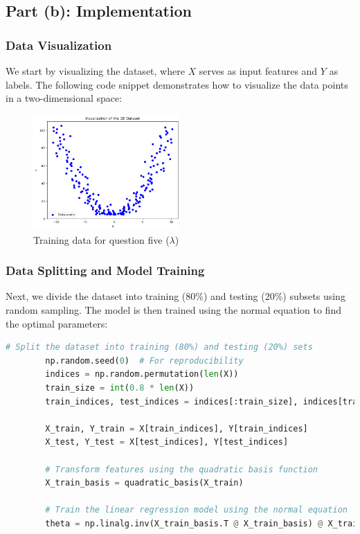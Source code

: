 \documentclass{article}
\begin{document}
	\subsection*{Part (b): Implementation}
	
	\subsubsection*{Data Visualization}
	We start by visualizing the dataset, where \( X \) serves as input features and \( Y \) as labels. The following code snippet demonstrates how to visualize the data points in a two-dimensional space:
	
	
	\begin{figure}[!h]
		\centering
		\includegraphics[width=0.5\textwidth]{images/q5_data.png}
		\caption{Training data for question five (\(\lambda\))}
		\label{fig:q5_data}
	\end{figure}
	
	\subsubsection*{Data Splitting and Model Training}
	Next, we divide the dataset into training (80\%) and testing (20\%) subsets using random sampling. The model is then trained using the normal equation to find the optimal parameters:
	\begin{lstlisting}[language=Python]
		# Split the dataset into training (80%) and testing (20%) sets
		np.random.seed(0)  # For reproducibility
		indices = np.random.permutation(len(X))
		train_size = int(0.8 * len(X))
		train_indices, test_indices = indices[:train_size], indices[train_size:]
		
		X_train, Y_train = X[train_indices], Y[train_indices]
		X_test, Y_test = X[test_indices], Y[test_indices]
		
		# Transform features using the quadratic basis function
		X_train_basis = quadratic_basis(X_train)
		
		# Train the linear regression model using the normal equation
		theta = np.linalg.inv(X_train_basis.T @ X_train_basis) @ X_train_basis.T @ Y_train
	\end{lstlisting}
	
\end{document}
